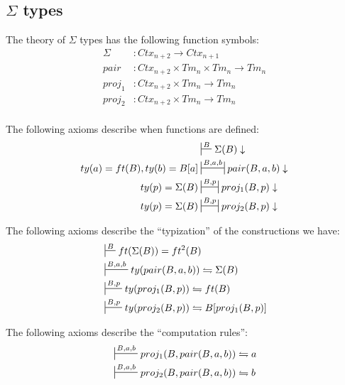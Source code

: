 \documentclass{amsart}
\theoremstyle{definition}
\theoremstyle{remark}
\numberwithin{figure}{section}
\begin{document}
\subsection{$\Sigma$ types}

The theory of $\Sigma$ types has the following function symbols:
\begin{align*}
\Sigma & : Ctx_{n+2} \to Ctx_{n+1} \\
pair   & : Ctx_{n+2} \times Tm_n \times Tm_n \to Tm_n \\
proj_1 & : Ctx_{n+2} \times Tm_n \to Tm_n \\
proj_2 & : Ctx_{n+2} \times Tm_n \to Tm_n \\
& \end{align*}

The following axioms describe when functions are defined:
\begin{align*}
                            & \sststile{}{B} \Sigma(B) \downarrow \\
ty(a) = ft(B), ty(b) = B[a] & \ssststile{}{B,a,b} pair(B,a,b) \downarrow \\
ty(p) = \Sigma(B)           & \ssststile{}{B,p} proj_1(B,p) \downarrow \\
ty(p) = \Sigma(B)           & \ssststile{}{B,p} proj_2(B,p) \downarrow
\end{align*}

The following axioms describe the ``typization'' of the constructions we have:
\begin{align*}
& \sststile{}{B} ft(\Sigma(B)) = ft^2(B) \\
& \sststile{}{B,a,b} ty(pair(B,a,b)) \leftrightharpoons \Sigma(B) \\
& \sststile{}{B,p} ty(proj_1(B,p)) \leftrightharpoons ft(B) \\
& \sststile{}{B,p} ty(proj_2(B,p)) \leftrightharpoons B[proj_1(B,p)]
\end{align*}

The following axioms describe the ``computation rules'':
\begin{align*}
& \sststile{}{B,a,b} proj_1(B,pair(B,a,b)) \leftrightharpoons a \\
& \sststile{}{B,a,b} proj_2(B,pair(B,a,b)) \leftrightharpoons b \\
\end{align*}



\end{document}
